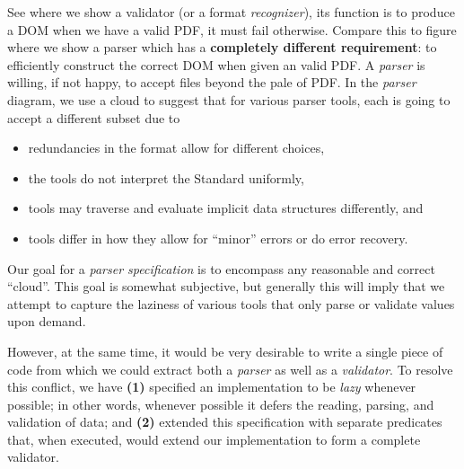 See  where we show a validator (or a format \emph{recognizer}),
its function is to produce a DOM when we have a valid PDF, it must fail
otherwise.  Compare this to figure  where we show a parser
which has a {\bf{completely different requirement}}: to efficiently construct
the correct DOM when given an valid PDF.  A \emph{parser} is willing, if not
happy, to accept files beyond the pale of PDF.
In the \emph{parser} diagram,
we use a cloud to suggest that for various parser tools,
each is going to accept a different subset due to
\begin{itemize}
\item redundancies in the format allow for different choices,
\item the tools do not interpret the Standard uniformly,
\item tools may traverse and evaluate implicit data structures differently, and
\item tools differ in how they allow for ``minor'' errors or do error recovery.
\end{itemize}
Our goal for a \emph{parser specification} is to encompass any reasonable and
correct ``cloud''.  This goal is somewhat subjective, but generally this will
imply that we attempt to capture the laziness of various tools that only parse
or validate values upon demand.

% 

However, at the same time, it would be very desirable to
write a single piece of code from which we could extract
both a \emph{parser} as well as a \emph{validator}.
To resolve this conflict, we have %
\textbf{(1)} specified an implementation to be \emph{lazy} whenever possible;
in other words, whenever possible it defers the reading, parsing, and validation
of data; and %
\textbf{(2)} extended this specification
with separate  predicates that, when executed,
would extend our implementation to form a complete validator.

